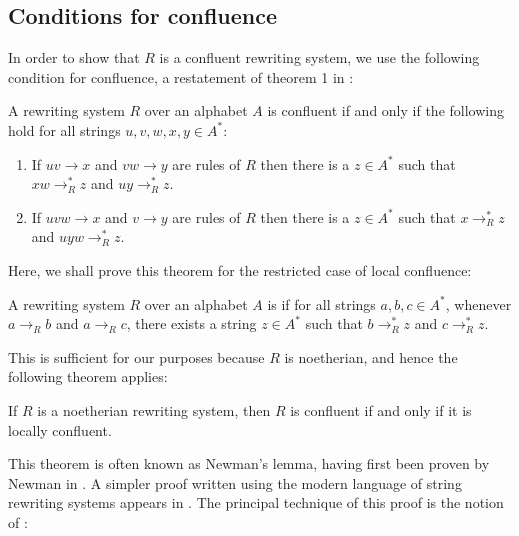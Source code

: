 \documentclass[11pt,libertine,widepage,nosubthm]{lmaths}
\begin{document}
\subsection{Conditions for confluence}

In order to show that $R$ is a confluent rewriting system, we use the following condition for confluence, a restatement of theorem 1 in \cite{McNaughton1987}:
\begin{theorem}
	A rewriting system $R$ over an alphabet $A$ is confluent if and only if the following hold for all strings $u, v, w, x, y \in A^*$:
	\begin{enumerate}[(1)]
		\item \label{it:conf-overlap} If $uv \to x$ and $vw \to y$ are rules of $R$ then there is a $z \in A^*$ such that $xw \to^*_R z$ and $uy \to^*_R z$.
		\item \label{it:conf-middle} If $uvw \to x$ and $v \to y$ are rules of $R$ then there is a $z \in A^*$ such that $x \to^*_R z$ and $uyw \to^*_R z$.
	\end{enumerate}
\end{theorem}

Here, we shall prove this theorem for the restricted case of local confluence:

\begin{defn}
	A rewriting system $R$ over an alphabet $A$ is  if for all strings $a, b, c \in A^*$, whenever $a \to_R b$ and $a \to_R c$, there exists a string $z \in A^*$ such that $b \to^*_R z$ and $c \to^*_R z$.
\end{defn}

This is sufficient for our purposes because $R$ is noetherian, and hence the following theorem applies:

\begin{theorem}[Newman] \label{thm:newman}
	If $R$ is a noetherian rewriting system, then $R$ is confluent if and only if it is locally confluent.
\end{theorem}

This theorem is often known as Newman's lemma, having first been proven by Newman in \cite{Newman1942}. A simpler proof written using the modern language of string rewriting systems appears in \cite{Huet1980}. The principal technique of this proof is the notion of :
\end{document}
